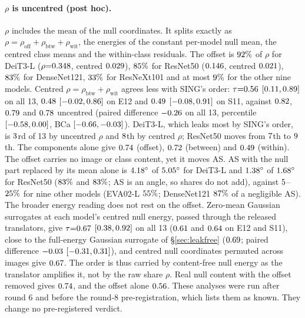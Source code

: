 \documentclass[10pt]{article}
\begin{document}
\paragraph{$\rho$ is uncentred (post hoc).}
$\rho$ includes the mean of the null coordinates. It splits exactly as $\rho=\rho_{\mathrm{off}}+\rho_{\mathrm{btw}}+\rho_{\mathrm{wit}}$, the energies of the constant per-model null mean, the centred class means and the within-class residuals. The offset is $92\%$ of $\rho$ for DeiT3-L ($\rho{=}0.348$, centred $0.029$), $85\%$ for ResNet50 ($0.146$, centred $0.021$), $83\%$ for DenseNet121, $33\%$ for ResNeXt101 and at most $9\%$ for the other nine models.
Centred $\rho=\rho_{\mathrm{btw}}+\rho_{\mathrm{wit}}$ agrees less with SING's order: $\tau{=}0.56$ $[0.11,0.89]$ on all 13, $0.48$ $[{-}0.02,0.86]$ on E12 and $0.49$ $[{-}0.08,0.91]$ on S11, against $0.82$, $0.79$ and $0.78$ uncentred (paired difference ${-}0.26$ on all 13, percentile $[{-}0.58,0.00]$, BCa $[{-}0.66,{-}0.03]$). DeiT3-L, which leaks most by SING's order, is $3$rd of 13 by uncentred $\rho$ and $8$th by centred $\rho$; ResNet50 moves from $7$th to $9$th. The components alone give $0.74$ (offset), $0.72$ (between) and $0.49$ (within).
The offset carries no image or class content, yet it moves AS. AS with the null part replaced by its mean alone is $4.18^\circ$ of $5.05^\circ$ for DeiT3-L and $1.38^\circ$ of $1.68^\circ$ for ResNet50 ($83\%$ and $83\%$; AS is an angle, so shares do not add), against $5$--$25\%$ for nine other models (EVA02-L $55\%$; DenseNet121 $87\%$ of a negligible AS).
The broader energy reading does not rest on the offset. Zero-mean Gaussian surrogates at each model's centred null energy, passed through the released translators, give $\tau{=}0.67$ $[0.38,0.92]$ on all 13 ($0.61$ and $0.64$ on E12 and S11), close to the full-energy Gaussian surrogate of \S\ref{sec:leakfree} ($0.69$; paired difference ${-}0.03$ $[{-}0.31,0.31]$), and centred null coordinates permuted across images give $0.67$. The order is thus carried by content-free null energy as the translator amplifies it, not by the raw share $\rho$. Real null content with the offset removed gives $0.74$, and the offset alone $0.56$.
These analyses were run after round 6 and before the round-8 pre-registration, which lists them as known. They change no pre-registered verdict.
\end{document}
